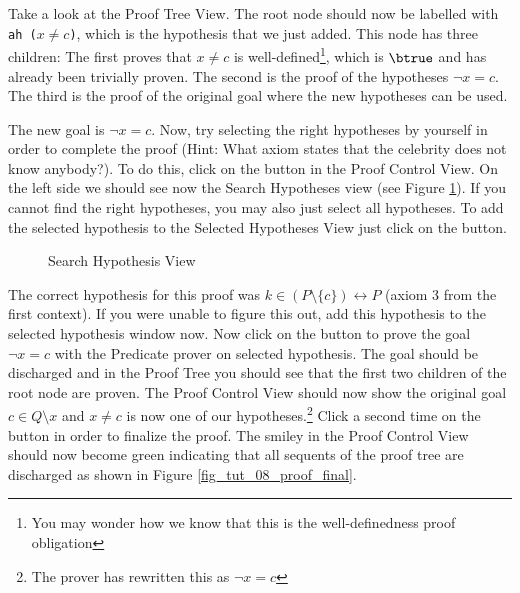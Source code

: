 \ifinprint\pagebreak\fi %

Take a look at the Proof Tree View. The root node should now be labelled with \texttt{ah ($x\neq c$)},
  which is the hypothesis that we just added.
This node has three children: The first proves that $x\neq c$ is well-defined\footnote{You may wonder how we know that this is the well-definedness proof obligation}, which is $\btrue$ and has already been trivially proven.
The second is the proof of the hypotheses $\lnot x=c$.
The third is the proof of the original goal where the new hypotheses can be used.

The new goal is $\lnot x = c$. Now, try selecting the right hypotheses by yourself in order to complete the proof (Hint: What axiom states that the celebrity does not know anybody?). To do this, click on the  button in the \textsf{Proof Control View}. On the left side we should see now the \textsf{Search Hypotheses} view (see Figure \ref{fig_tut_08_search_hypothesis}). If you cannot find the right hypotheses, you may also just select all hypotheses. To add the selected hypothesis to the \textsf{Selected Hypotheses View} just click on the  button. 


\begin{figure}[!ht]
\begin{center}
	\caption{Search Hypothesis View}
	\label{fig_tut_08_search_hypothesis}
\end{center}
\end{figure}

The correct hypothesis for this proof was $k \in  (P \setminus  \{ c\} ) \rel  P$ (axiom 3 from the first context). If you were unable to figure this out, add this hypothesis to the selected hypothesis window now. Now click on the  button to prove the goal $\lnot x = c$ with the \textsf{Predicate prover on selected hypothesis}. The goal should be discharged and in the Proof Tree you should see that the first two children of the root node are proven. The \textsf{Proof Control View} should now show the original goal $c \in Q \setminus {x}$ and $x\neq c$ is now one of our hypotheses.\footnote{The prover has rewritten this as $ \lnot x = c$} Click a second time on the  button in order to finalize the proof. The smiley in the \textsf{Proof Control View} should now become green indicating that all sequents of the proof tree are discharged as shown in Figure \ref{fig_tut_08_proof_final}.

